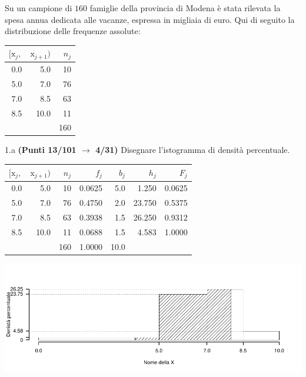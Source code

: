 \documentclass[
  11pt,
]{book}
\theoremstyle{mytheoremstyle}
\theoremstyle{mydefstyle}
\newenvironment{sol}
  {
  \begin{tcolorbox}[enhanced,breakable,arc=0.1mm,boxrule=1pt,colback=white,colframe=iblue,
  title=\bf \fontfamily{lmss}\selectfont \hspace{.5 cm} Soluzione,drop fuzzy shadow]

}{
\end{tcolorbox}
  }
\begin{document}
Su un campione di \(160\) famiglie della provincia di Modena è stata rilevata la spesa annua dedicata alle vacanze, espressa in migliaia di euro. Qui di seguito la distribuzione delle frequenze assolute:

\begin{table}[H]
\centering
\begin{tabular}{rrr}
\toprule
$[\text{x}_j,$ & $\text{x}_{j+1})$ & $n_j$\\
\midrule
0.0 & 5.0 & 10\\
5.0 & 7.0 & 76\\
7.0 & 8.5 & 63\\
8.5 & 10.0 & 11\\
 &  & 160\\
\bottomrule
\end{tabular}
\end{table}

1.a \textbf{(Punti 13/101 \(\rightarrow\) 4/31)} Disegnare l'istogramma di densità percentuale.

\begin{sol}

\begin{table}[H]
\centering
\begin{tabular}{rrrrrrr}
\toprule
$[\text{x}_j,$ & $\text{x}_{j+1})$ & $n_j$ & $f_j$ & $b_j$ & $h_j$ & $F_j$\\
\midrule
0.0 & 5.0 & 10 & 0.0625 & 5.0 & 1.250 & 0.0625\\
5.0 & 7.0 & 76 & 0.4750 & 2.0 & 23.750 & 0.5375\\
7.0 & 8.5 & 63 & 0.3938 & 1.5 & 26.250 & 0.9312\\
8.5 & 10.0 & 11 & 0.0688 & 1.5 & 4.583 & 1.0000\\
 &  & 160 & 1.0000 & 10.0 &  & \\
\bottomrule
\end{tabular}
\end{table}

\begin{center}\includegraphics{Esami_passati_con_soluzioni_files/figure-latex/2023-171-1} \end{center}

\end{sol}
\end{document}
